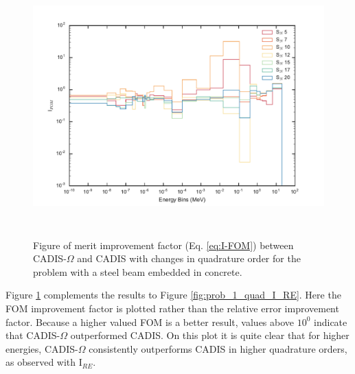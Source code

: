 
\begin{figure}[h!]
  \centering
  \includegraphics[height=10cm]{./chapters/characterization_probs/figures/angle/prob_1/compare_fom_quad.pdf}
  \caption[Figure of merit improvement factor (Eq. \eqref{eq:I-FOM}) between CADIS-$\Omega$ and
  CADIS with changes in quadrature order for steel beam embedded in concrete.]
  {Figure of merit improvement factor (Eq. \eqref{eq:I-FOM}) between CADIS-$\Omega$ and
   CADIS with changes in quadrature order for the problem with
   a steel beam embedded in concrete.}
  \label{fig:prob_1_quad_I_FOM}
\end{figure}

Figure \ref{fig:prob_1_quad_I_FOM} complements the results to Figure
\ref{fig:prob_1_quad_I_RE}. Here the FOM improvement factor is plotted rather
than the relative error improvement factor. Because a higher valued FOM is a
better result, values above $10^{0}$ indicate that CADIS-$\Omega$ outperformed
CADIS. On this plot it is quite clear that for higher energies, CADIS-$\Omega$
consistently outperforms CADIS 
in higher quadrature orders, as observed with I$_{RE}$.


